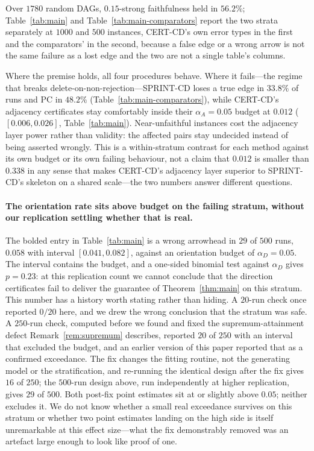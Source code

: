Over $1780$ random DAGs, $0.15$-strong faithfulness held in $56.2\%$;
Table~\ref{tab:main} and Table~\ref{tab:main-comparators} report the two
strata separately at $1000$ and $500$ instances, CERT-CD's own error types in
the first and the comparators' in the second, because a false edge or a wrong
arrow is not the same failure as a lost edge and the two are not a single
table's columns.

Where the premise holds, all four procedures behave. Where it fails---the
regime that breaks delete-on-non-rejection---SPRINT-CD loses a true edge in
$33.8\%$ of runs and PC in $48.2\%$ (Table~\ref{tab:main-comparators}), while
CERT-CD's adjacency certificates stay comfortably inside their
$\alpha_A = 0.05$ budget at $0.012$ ($[0.006, 0.026]$,
Table~\ref{tab:main}). Near-unfaithful instances cost the adjacency layer
power rather than validity: the affected pairs stay undecided instead of
being asserted wrongly. This is a within-stratum contrast for each method
against its own budget or its own failing behaviour, not a claim that
$0.012$ is smaller than $0.338$ in any sense that makes CERT-CD's adjacency
layer superior to SPRINT-CD's skeleton on a shared scale---the two numbers
answer different questions.

\paragraph{The orientation rate sits above budget on the failing stratum,
without our replication settling whether that is real.} The bolded entry in
Table~\ref{tab:main} is a wrong arrowhead in $29$ of $500$ runs, $0.058$ with
interval $[0.041, 0.082]$, against an orientation budget of $\alpha_D = 0.05$.
The interval contains the budget, and a one-sided binomial test against
$\alpha_D$ gives $p = 0.23$: at this replication count we cannot conclude
that the direction certificates fail to deliver the guarantee of
Theorem~\ref{thm:main} on this stratum. This number has a history worth
stating rather than hiding. A $20$-run check once reported $0/20$ here, and
we drew the wrong conclusion that the stratum was safe. A $250$-run check,
computed before we found and fixed the supremum-attainment defect
Remark~\ref{rem:supremum} describes, reported $20$ of $250$ with an interval
that excluded the budget, and an earlier version of this paper reported that
as a confirmed exceedance. The fix changes the fitting routine, not the
generating model or the stratification, and re-running the identical design
after the fix gives $16$ of $250$; the $500$-run design above, run
independently at higher replication, gives $29$ of $500$. Both post-fix point
estimates sit at or slightly above $0.05$; neither excludes it. We do not
know whether a small real exceedance survives on this stratum or whether two
point estimates landing on the high side is itself unremarkable at this
effect size---what the fix demonstrably removed was an artefact large enough
to look like proof of one.

